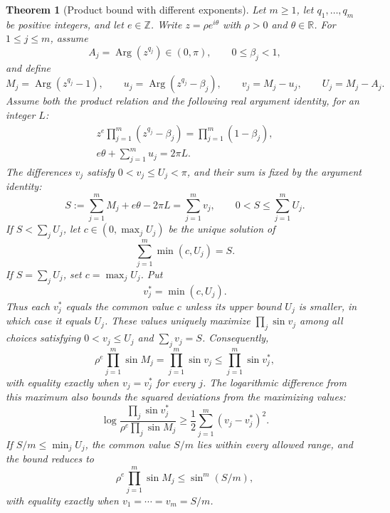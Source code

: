 \documentclass[11pt,a4paper]{article}
\newtheorem{theorem}{Theorem}[section]
\theoremstyle{definition}
\theoremstyle{remark}
\numberwithin{equation}{section}
\begin{document}
\begin{theorem}[Product bound with different exponents]\label{thm:unequal-product-bound}
Let $m\ge1$, let $q_1,\ldots,q_m$ be positive integers, and let $e\in\mathbb Z$. Write $z=\rho e^{i\theta}$ with $\rho>0$ and $\theta\in\mathbb R$. For $1\le j\le m$, assume
\[
 A_j=\operatorname{Arg}(z^{q_j})\in(0,\pi),\qquad0\le\beta_j<1,
\]
and define
\[
 M_j=\operatorname{Arg}(z^{q_j}-1),\qquad
 u_j=\operatorname{Arg}(z^{q_j}-\beta_j),\qquad
 v_j=M_j-u_j,\qquad U_j=M_j-A_j.
\]
Assume both the product relation and the following real argument identity, for an integer $L$:
\begin{equation}\label{eq:unequal-product-phase}
 \begin{gathered}
 z^e\prod_{j=1}^m(z^{q_j}-\beta_j)=\prod_{j=1}^m(1-\beta_j),\\
 e\theta+\sum_{j=1}^m u_j=2\pi L.
 \end{gathered}
\end{equation}
The differences $v_j$ satisfy $0<v_j\le U_j<\pi$, and their sum is fixed by the argument identity:
\[
 S:=\sum_{j=1}^mM_j+e\theta-2\pi L=\sum_{j=1}^m v_j,
 \qquad0<S\le\sum_{j=1}^mU_j.
\]
If $S<\sum_jU_j$, let $c\in(0,\max_jU_j)$ be the unique solution of
\[
 \sum_{j=1}^m\min(c,U_j)=S.
\]
If $S=\sum_jU_j$, set $c=\max_jU_j$. Put
\[
 v_j^*=\min(c,U_j).
\]
Thus each $v_j^*$ equals the common value $c$ unless its upper bound $U_j$ is smaller, in which case it equals $U_j$.
These values uniquely maximize $\prod_j\sin v_j$ among all choices satisfying $0<v_j\le U_j$ and $\sum_jv_j=S$. Consequently,
\begin{equation}\label{eq:unequal-sharp-product}
 \rho^e\prod_{j=1}^m\sin M_j
   =\prod_{j=1}^m\sin v_j
   \le\prod_{j=1}^m\sin v_j^*,
\end{equation}
with equality exactly when $v_j=v_j^*$ for every $j$. The logarithmic difference from this maximum also bounds the squared deviations from the maximizing values:
\begin{equation}\label{eq:unequal-quadratic-deficit}
 \log\frac{\prod_j\sin v_j^*}{\rho^e\prod_j\sin M_j}
       \ge\frac12\sum_{j=1}^m(v_j-v_j^*)^2.
\end{equation}
If $S/m\le\min_jU_j$, the common value $S/m$ lies within every allowed range, and the bound reduces to
\[
 \rho^e\prod_{j=1}^m\sin M_j\le\sin^m(S/m),
\]
with equality exactly when $v_1=\cdots=v_m=S/m$.
\end{theorem}
\end{document}
